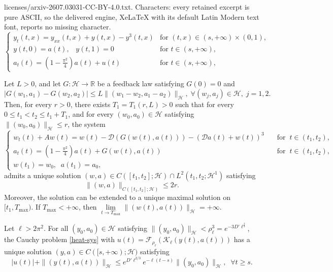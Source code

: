 \documentclass[10pt,a4paper]{amsart}
\begin{document}
licenses/arxiv-2607.03031-CC-BY-4.0.txt. Characters: every retained excerpt is pure ASCII, so the delivered engine, XeLaTeX with its default Latin Modern text font, reports no missing character.
\begin{equation}\label{heat-sys}
\left\{\begin{array}{ll}
 y_t(t,x) = y_{xx}( t,x)+y(t,x)-y^3( t,x)&\text{for }(t,x)\in(s,+\infty)  \times (0,1),\\[2mm]
y(t,0)=a(t),\;\;\;y(t,1)=0&\text{for }t\in(s,+\infty) ,\\[2mm]
a_t(t)=(1-\frac{\pi^2}{4})a(t)+u(t)&\text{for }t\in(s,+\infty),
\end{array}\right.
\end{equation}

\begin{lemma}\label{w2}
Let $L>0$, and let $G:\mathcal{H}\to\mathbb{R}$ be a feedback law satisfying $G(0)=0$ and
$$|G(w_1,a_1)-G(w_2,a_2)|\le L\|(w_1-w_2,a_1-a_2)\|_{\mathcal{H}},\;\forall (w_j,a_j)\in \mathcal{H},\;j=1,2.$$
Then, for every $r>0$, there exists $T_1=T_1\left(r,L\right)>0$ such that for every $0\le t_1<t_2\le t_1+T_1$, and for every $(w_0,a_0)\in \mathcal{H}$ satisfying $\|(w_0,a_0)\|_{\mathcal H}\le r$, the system
\begin{equation}\label{we1}
\left\{\begin{array}{ll}
    w_t(t)+Aw(t)=w(t)-\mathcal{D}(G(w(t),a(t)))-(\mathcal{D}a(t)+w(t))^3\quad&\text{for}\;\;t\in (t_1,t_2),\\
    a_t(t)=(1-\frac{\pi^2}{4})a(t)+G(w(t),a(t))\quad&\text{for}\;\;t\in (t_1,t_2),\\
    w(t_1)=w_0,\;\;a(t_1)=a_0,
\end{array}\right.
\end{equation}
admits a unique solution $(w,a)\in C([t_1,t_2];\mathcal H)\cap L^2(t_1,t_2;\mathcal H^1)$ satisfying
\begin{equation}\label{es1}
\|(w,a)\|_{C([t_1,t_2];\mathcal{H})}\le 2r.
\end{equation}
Moreover, the solution can be extended to a unique maximal solution on
$[t_1,T_{\max})$. If $T_{\max}<+\infty$, then $\lim\limits_{t\to T_{\max}^-}\|(w(t),a(t))\|_{\mathcal H}=+\infty.$
\end{lemma}

\begin{proposition}\label{qu-ra-sta-ne}
Let $\ell>2\pi^2$. For all $(y_0,a_0)\in \mathcal{H}$ satisfying $\|(y_0,a_0)\|_{\mathcal{H}}<\rho_{\ell}^3=e^{-3D'{\ell}^{\frac{2}{3}}}$, the Cauchy problem \eqref{heat-sys} with $u(t)=\mathcal{F}_{\rho_{\ell}}(\mathcal{K}_{\ell}(y(t),a(t)))$
has a unique solution $(y,a)\in C([s,+\infty);\mathcal{H})$ satisfying 
\begin{equation}\label{exp-s-heat2}
|u(t)|+	\|(y(t),a(t))\|_{\mathcal{H}}\le e^{D'{\ell}^{2/3}}e^{-\ell (t-s)}\|(y_0,a_0)\|_{\mathcal{H}},\;\;\forall t\ge s.
\end{equation}
\end{proposition}
\end{document}
